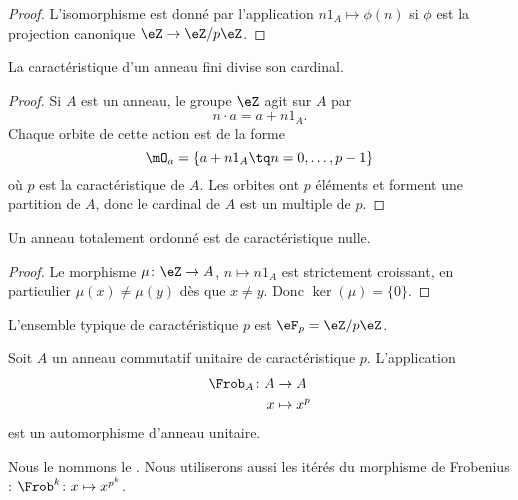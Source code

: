 \begin{proof}
    L'isomorphisme est donné par l'application \( n1_A\mapsto \phi(n)\) si \( \phi\) est la projection canonique \( \eZ\to \eZ/p\eZ\).
\end{proof}

\begin{proposition}     \label{PropGExaUK}
    La caractéristique d'un anneau fini divise son cardinal.
\end{proposition}

\begin{proof}
    Si \( A\) est un anneau, le groupe \( \eZ\) agit sur \( A\) par
    \begin{equation}
        n\cdot a=a+n1_A.
    \end{equation}
    Chaque orbite de cette action est de la forme
    \begin{equation}
        \mO_a=\{ a+n1_A\tq n=0,\ldots, p-1 \}
    \end{equation}
    où \( p\) est la caractéristique de \( A\). Les orbites ont \( p\) éléments et forment une partition de \( A\), donc le cardinal de \( A\) est un multiple de \( p\).
\end{proof}

\begin{lemma}        \label{LEMooJQIKooQgukqn}
    Un anneau totalement ordonné est de caractéristique nulle.
\end{lemma}

\begin{proof}
    Le morphisme \( \mu\colon \eZ\to A\), \( n\mapsto n 1_A\) est strictement croissant, en particulier \( \mu(x)\neq \mu(y)\) dès que \( x\neq y\). Donc \( \ker(\mu)=\{ 0 \}\).
\end{proof}

L'ensemble typique de caractéristique \( p\) est \( \eF_p=\eZ/p\eZ\).

\begin{proposition} \label{PropFrobHAMkTY}
    Soit \( A\) un anneau commutatif unitaire de caractéristique \( p\). L'application
    \begin{equation}
        \begin{aligned}
            \Frob_A\colon A&\to A \\
            x&\mapsto x^p
        \end{aligned}
    \end{equation}
    est un automorphisme d'anneau unitaire.
\end{proposition}
Nous le nommons le . Nous utiliserons aussi les itérés du morphisme de Frobenius : \( \Frob^k\colon x\mapsto x^{p^k}\).

